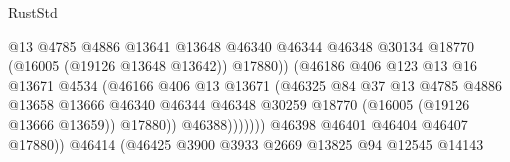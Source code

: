 \begin{lexlean}{RustStd}
\begin{coremodule}
                                              @13
                                              @4785
                                              @4886
                                              @13641
                                              @13648
                                              @46340
                                              @46344
                                              @46348
                                              @30134
                                              @18770
                                              (@16005 (@19126 @13648 @13642))
                                              @17880))
                                          (@46186
                                            @406
                                            @123
                                            @13
                                            @16
                                            @13671
                                            @4534
                                            (@46166
                                              @406
                                              @13
                                              @13671
                                              (@46325
                                                @84
                                                @37
                                                @13
                                                @4785
                                                @4886
                                                @13658
                                                @13666
                                                @46340
                                                @46344
                                                @46348
                                                @30259
                                                @18770
                                                (@16005 (@19126 @13666 @13659))
                                                @17880))
                                            @46388)))))))
                              @46398
                              @46401
                              @46404
                              @46407
                              @17880))
                          @46414
                          (@46425
                            @3900
                            @3933
                            @2669
                            @13825
                            @94
                            @12545
                            @14143

\end{coremodule}
\end{lexlean}
